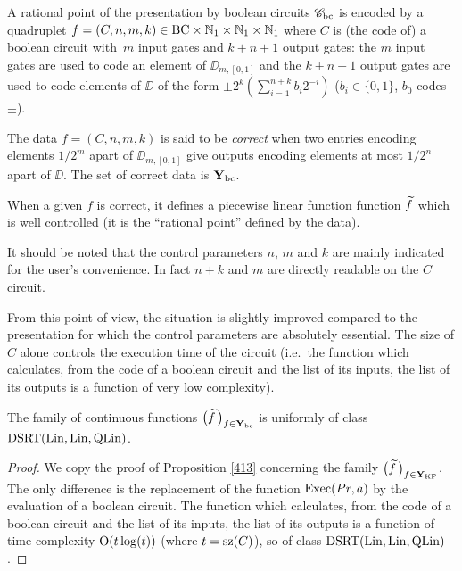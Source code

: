 \begin{definition} \label{418}
A rational point of the presentation by boolean circuits ${{{\mathscr C}}_{\rm bc}}$ is encoded by a quadruplet $f = (C, n, m, k) \in {\rm BC} \times \mathbb {N}_1 \times \mathbb {N}_1 \times 
\mathbb {N}_1$ where $C$ is (the code of) a boolean circuit with~$m$ input gates and $k+n+1$ output gates: the $m$ input gates are used to code an element of $\DD_{m,[0,1]}$ and the $k+n+1$ output gates are used to code elements of $\DD$ of the form $\pm 2^k\left( \sum_{i=1}^{n+k}b_i2^{-i}\right)$ ($b_i\in\{0,1\}$, $b_0$ codes $\pm$).

\noindent 
The data $f = (C, n, m, k)$ is said to be {\em correct} when two entries 
encoding elements  $1/2^m$ apart of $\DD_{m,[0,1]}$ give outputs 
encoding elements at most $1/2^n$ apart of $\DD$. The set of correct data is ${{\bf Y}_{\rm bc}}$.

\noindent 
When a given $f$ is correct, it defines a piecewise linear function function $\widetilde{f}$ which is well controlled (it is the ``rational point'' defined by the data).
\end{definition}

It should be noted that the control parameters $n$, $m$ and $k$ are mainly indicated for the user's convenience. In fact $n+k$ and $m$ are 
directly readable on the $C$ circuit. 

From this point of view, the situation is slightly improved compared to the presentation for which the control parameters are absolutely essential. 
The size of $C$ alone controls the execution time of the circuit 
(i.e.\ the function which calculates, from the code of a boolean circuit and the list of its inputs, the list of its outputs is a function of very low complexity).

\begin{proposition} \label{419} 
The family of continuous functions $\big(\widetilde{f}\,\big)_{f \in {{\bf Y}_{\rm bc}} }$ is uniformly of 
class ${\rm DSRT}({\rm Lin}, {\rm Lin}, {\rm QLin})$.
\end{proposition}

\begin{proof}
We copy the proof of Proposition \ref{413} concerning the family $\big(\widetilde{f}\,\big)_{f \in {{\bf Y}_{\rm KF}}}$. The only difference is the replacement of the function ${\rm Exec}(Pr,a)$ by the evaluation of a boolean circuit. 
The function which calculates, from the code of a boolean circuit and the list of its inputs, the list of its outputs is a function of time complexity ${\rm O}(t\log(t))$ (where $t = {\rm sz}(C)$), 
so of class ${\rm DSRT}({\rm Lin},{\rm Lin},{\rm QLin})$. 	 
\end{proof}


